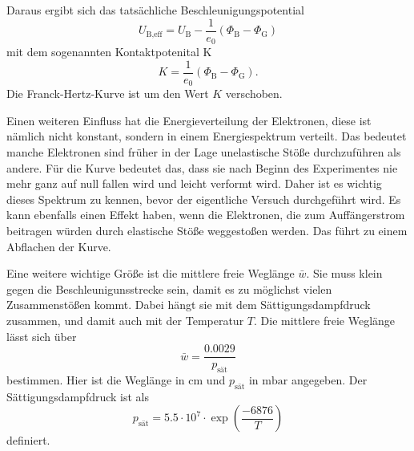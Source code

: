 Daraus ergibt sich das tatsächliche Beschleunigungspotential 
\begin{equation}
    U_\text{B,eff} = U_\text{B} - \frac{1}{e_0} \left(\Phi_\text{B} - \Phi_\text{G} \right)
    \label{eq:ueff}
\end{equation}
mit dem sogenannten Kontaktpotenital K
\begin{equation}
    K = \frac{1}{e_0} \left(\Phi_\text{B} - \Phi_\text{G} \right).
    \label{eq:kontakt}
\end{equation}
Die Franck-Hertz-Kurve ist um den Wert $K$ verschoben.

Einen weiteren Einfluss hat die Energieverteilung der Elektronen, diese ist nämlich nicht konstant, sondern in einem Energiespektrum verteilt. 
Das bedeutet manche Elektronen sind früher in der Lage unelastische Stöße durchzuführen als andere.
Für die Kurve bedeutet das, dass sie nach Beginn des Experimentes nie mehr ganz auf null fallen wird und leicht verformt wird.
Daher ist es wichtig dieses Spektrum zu kennen, bevor der eigentliche Versuch durchgeführt wird.
Es kann ebenfalls einen Effekt haben, wenn die Elektronen, die zum Auffängerstrom beitragen würden durch elastische Stöße weggestoßen werden. Das führt zu einem Abflachen der Kurve.

Eine weitere wichtige Größe ist die mittlere freie Weglänge $\bar{w}$. 
Sie muss klein gegen die Beschleunigunsstrecke sein, damit es zu möglichst vielen Zusammenstößen kommt.
Dabei hängt sie mit dem Sättigungsdampfdruck zusammen, und damit auch mit der Temperatur $T$.
Die mittlere freie Weglänge lässt sich über 
\begin{equation}
    \bar{w} = \frac{0.0029}{p_\text{sät}}
    \label{eq:wegl}
\end{equation}
bestimmen.
Hier ist die Weglänge in $\si{\centi\meter}$ und $p_\text{sät}$ in $\si{\milli\bar}$ angegeben.
Der Sättigungsdampfdruck ist als 
\begin{equation}
    p_\text{sät} = 5.5 \cdot 10^7 \cdot \exp{\left(\frac{-6876}{T}\right)}
    \label{eq:dampfdr}
\end{equation}
definiert.
